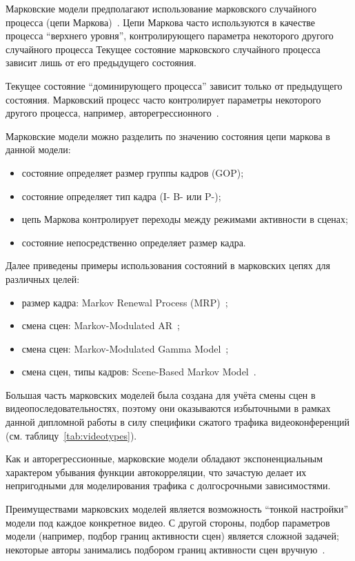 Марковские модели предполагают использование марковского
случайного процесса (цепи Маркова)~\cite{markovchains}.
Цепи Маркова часто используются в качестве процесса
``верхнего уровня'', контролирующего параметра некоторого
другого случайного процесса
Текущее состояние марковского случайного процесса зависит
лишь от его предыдущего состояния.

Текущее состояние ``доминирующего процесса'' зависит
только от предыдущего состояния. Марковский процесс
часто контролирует параметры некоторого другого процесса,
например, авторегрессионного~\cite{mmar}.

Марковские модели можно разделить по значению состояния цепи
маркова в данной модели:

\begin{itemize}
    \item состояние определяет размер группы кадров (GOP);
    \item состояние определяет тип кадра (I- B- или P-);
    \item цепь Маркова контролирует переходы между режимами
        активности в сценах;
    \item состояние непосредственно определяет размер кадра.
\end{itemize}
\hspace{3pt}


Далее приведены примеры использования состояний в марковских
цепях для различных целей:
\begin{itemize}
    \item размер кадра: Markov Renewal Process (MRP)~\cite{heymanATM};
    \item смена сцен: Markov-Modulated AR~\cite{mmar};
    \item смена сцен: Markov-Modulated Gamma Model~\cite{mmg};
    \item смена сцен, типы кадров: Scene-Based Markov Model~\cite{scenemm}.
\end{itemize}

Большая часть марковских моделей была создана для учёта
смены сцен в видеопоследовательностях, поэтому они оказываются
избыточными в рамках данной дипломной работы в силу специфики
сжатого трафика видеоконференций (см. таблицу~\ref{tab:videotypes}).

Как и авторегрессионные, марковские модели обладают экспоненциальным
характером убывания функции автокорреляции, что зачастую
делает их непригодными для моделирования трафика с долгосрочными
зависимостями.

Преимуществами марковских моделей является возможность
``тонкой настройки'' модели под каждое конкретное видео.
С другой стороны, подбор параметров модели (например,
подбор границ активности сцен) является сложной задачей;
некоторые авторы занимались подбором границ активности
сцен вручную~\cite{mmar}.

